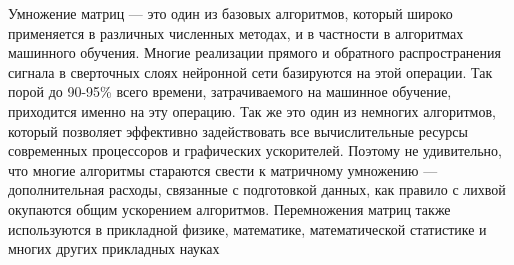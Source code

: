 \documentclass[../main.tex]{subfiles}
\begin{document}
	
	Умножение матриц — это один из базовых алгоритмов, который широко применяется в различных численных методах, и в частности в алгоритмах машинного обучения. 
	Многие реализации прямого и обратного распространения сигнала в сверточных слоях нейронной сети базируются на этой операции. 
	Так порой до 90-95\% всего времени, затрачиваемого на машинное обучение, приходится именно на эту операцию. 
	Так же это один из немногих алгоритмов, который позволяет эффективно задействовать все вычислительные ресурсы современных процессоров и графических ускорителей. 
	Поэтому не удивительно, что многие алгоритмы стараются свести к матричному умножению — дополнительная расходы, связанные с подготовкой данных, как правило с лихвой окупаются общим ускорением алгоритмов. 
	Перемножения матриц также используются в прикладной физике, математике, математической статистике и многих других прикладных науках
	
\end{document}
